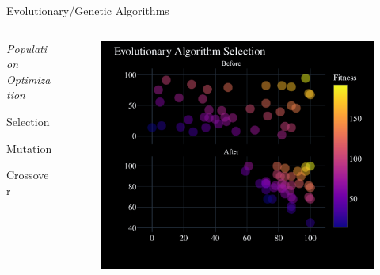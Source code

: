 \documentclass[aspectratio=169]{beamer}
\newcommand{\cb}[1]{{\color{c2} #1}}
\begin{document}
\begin{frame}{Evolutionary/Genetic Algorithms}
  \begin{columns}[T]
      \begin{column}{.4\linewidth}
      \Huge \textit{\cb{Population Optimization}}
      \begin{vfilleditems}
          \item \Huge Selection
          \item \Huge Mutation
          \item \Huge Crossover
      \end{vfilleditems}
      \end{column}
      \begin{column}{.6\linewidth}
          \begin{figure}
              \centering
              \includegraphics[width=0.95\linewidth, keepaspectratio]{figures/genetic_diagram.pdf}

\end{figure}
\end{column}
\end{columns}
\end{frame}
\end{document}
